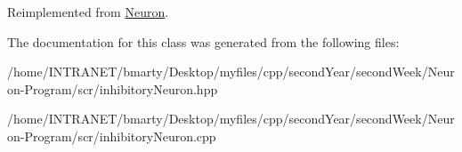 Reimplemented from \hyperlink{classNeuron_aec2283fbfaba764cd088e6d16b0a74bb}{Neuron}.



The documentation for this class was generated from the following files\-:\begin{DoxyCompactItemize}
\item 
/home/\-I\-N\-T\-R\-A\-N\-E\-T/bmarty/\-Desktop/myfiles/cpp/second\-Year/second\-Week/\-Neuron-\/\-Program/scr/inhibitory\-Neuron.\-hpp\item 
/home/\-I\-N\-T\-R\-A\-N\-E\-T/bmarty/\-Desktop/myfiles/cpp/second\-Year/second\-Week/\-Neuron-\/\-Program/scr/inhibitory\-Neuron.\-cpp\end{DoxyCompactItemize}
